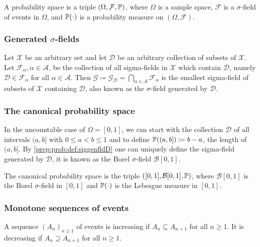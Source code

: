 \documentclass[10pt, a4paper]{article}
\begin{document}
\begin{definition}
    A probability space is a triple $(\Omega, \mathcal{F}, \P)$,
    where $\Omega$ is a sample space,
    $\mathcal{F}$ is a $\sigma$-field of events in $\Omega$,
    and $\P(\cdot)$ is a probability measure on $(\Omega, \mathcal{F})$.
\end{definition}

\subsubsection{Generated \texorpdfstring{$\sigma$}{}-fields}
\begin{definition}\label{prep:prob:def:siggenfldD}
    Let $\mathcal{X}$ be an arbitrary set and let $\mathcal{D}$ be an arbitrary collection of subsets of $\mathcal{X}$.
    Let $\mathcal{F}_{\alpha}, \alpha \in \mathcal{A}$,
    be the collection of all sigma-fields in $\mathcal{X}$ which contain $\mathcal{D}$,
    namely $\mathcal{D} \in \mathcal{F}_{\alpha}$ for all $\alpha \in \mathcal{A}$.
    Then $\mathcal{G} \coloneqq \mathcal{G}_{\mathcal{D}} = \bigcap_{\alpha \in \mathcal{A}}\mathcal{F}_{\alpha}$ is the smallest sigma-field of subsets of $\mathcal{X}$ containing $\mathcal{D}$,
    also known as the $\sigma$-field generated by $\mathcal{D}$.
\end{definition}

\subsubsection{The canonical probability space}
In the uncountable case of $\Omega = [0, 1]$,
we can start with the collection $\mathcal{D}$ of all intervals $(a, b]$ with $0 \leq a < b \leq 1$ and to define $\P((a, b]) \coloneqq b - a$,
the length of $(a, b]$.
By \autoref{prep:prob:def:siggenfldD} one can uniquely define the sigma-field generated by $\mathcal{D}$,
it is known as the Borel $\sigma$-field $\mathcal{B}[0, 1]$.

\begin{definition}
    The canonical probability space is the triple $([0, 1], \mathcal{B}[0, 1], \P)$,
    where $\mathcal{B}[0, 1]$ is the Borel $\sigma$-field in $[0, 1]$ and $\P(\cdot)$ is the Lebesgue measure in $[0, 1]$.
\end{definition}

\subsubsection{Monotone sequences of events}
\begin{definition}
    A sequence $(A_n)_{n \geq 1}$ of events is increasing if $A_n \subseteq A_{n + 1}$ for all $n \geq 1$.
    It is decreasing if $A_n \supseteq A_{n + 1}$ for all $n \geq 1$.
\end{definition}
\end{document}
